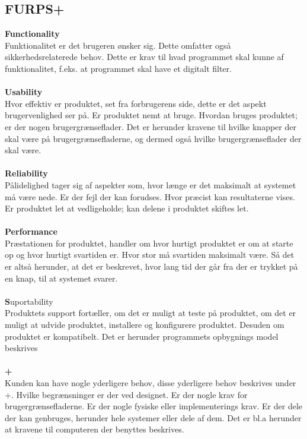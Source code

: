 \subsection{FURPS+}
\textbf{Functionality}\\
Funktionalitet er det brugeren ønsker sig. Dette omfatter også sikkerhedsrelaterede behov. Dette er krav til hvad programmet skal kunne af funktionalitet, f.eks. at programmet skal have et digitalt filter.\\\\
\textbf{Usability}\\
Hvor effektiv er produktet, set fra forbrugerens side, dette er det aspekt brugervenlighed ser på. Er produktet nemt at bruge. Hvordan bruges produktet; er der nogen brugergrænseflader. Det er herunder kravene til hvilke knapper der skal være på brugergrænsefladerne, og dermed også hvilke brugergrænseflader der skal være.\\\\
\textbf{Reliability}\\
Pålidelighed tager sig af aspekter som, hvor længe er det maksimalt at systemet må være nede. Er der fejl der kan forudses. Hvor præcist kan resultaterne vises. Er produktet let at vedligeholde; kan delene i produktet skiftes let.\\\\
\textbf{Performance}\\
Præstationen for produktet, handler om hvor hurtigt produktet er om at starte op og hvor hurtigt svartiden er. Hvor stor må svartiden maksimalt være. Så det er altså herunder, at det er beskrevet, hvor lang tid der går fra der er trykket på en knap, til at systemet svarer. \\\\
\textbf{S}uportability\\
Produktets support fortæller, om det er muligt at teste på produktet, om det er muligt at udvide produktet, installere og konfigurere produktet. Desuden om produktet er kompatibelt. Det er herunder programmets opbygnings model beskrives\\\\
\textbf{+}\\
Kunden kan have nogle yderligere behov, disse yderligere behov beskrives under +. Hvilke begrænsninger er der ved designet. Er der nogle krav for brugergrænsefladerne. Er der nogle fysiske eller implementerings krav. Er der dele der kan genbruges, herunder hele systemer eller dele af dem. Det er bl.a herunder at kravene til computeren der benyttes beskrives. \cite{furps}\\

